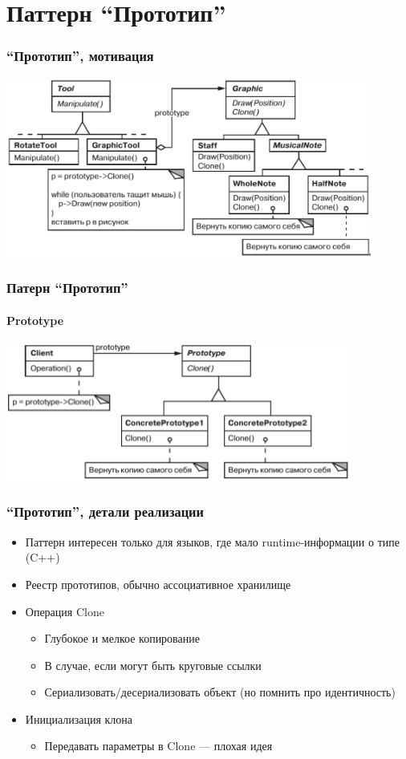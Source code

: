 \documentclass[xetex,mathserif,serif]{beamer}
\begin{document}
	\section{Паттерн ``Прототип''}

	\begin{frame}
		\frametitle{``Прототип'', мотивация}
		\begin{center}
			\includegraphics[width=0.9\textwidth]{musicalEditor.png}
		\end{center}
	\end{frame}

	\begin{frame}
		\frametitle{Патерн ``Прототип''}
		\framesubtitle{Prototype}
		\begin{center}
			\includegraphics[width=0.85\textwidth]{prototype.png}
		\end{center}
	\end{frame}
	
	\begin{frame}
		\frametitle{``Прототип'', детали реализации}
		\begin{itemize}
			\item Паттерн интересен только для языков, где мало runtime-информации о типе (C++)
			\item Реестр прототипов, обычно ассоциативное хранилище
			\item Операция Clone
			\begin{itemize}
				\item Глубокое и мелкое копирование
				\item В случае, если могут быть круговые ссылки
				\item Сериализовать/десериализовать объект (но помнить про идентичность)
			\end{itemize}
			\item Инициализация клона
			\begin{itemize}
				\item Передавать параметры в Clone --- плохая идея
			\end{itemize}
		\end{itemize}
	\end{frame}
\end{document}
